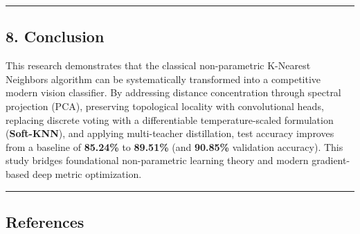 \begin{center}\rule{0.5\linewidth}{0.5pt}\end{center}

\subsection{8. Conclusion}\label{8-conclusion}

This research demonstrates that the classical non-parametric K-Nearest
Neighbors algorithm can be systematically transformed into a competitive
modern vision classifier. By addressing distance concentration through
spectral projection (PCA), preserving topological locality with
convolutional heads, replacing discrete voting with a differentiable
temperature-scaled formulation (\textbf{Soft-KNN}), and applying
multi-teacher distillation, test accuracy improves from a baseline of
\textbf{85.24\%} to \textbf{89.51\%} (and \textbf{90.85\%} validation
accuracy). This study bridges foundational non-parametric learning
theory and modern gradient-based deep metric optimization.

\begin{center}\rule{0.5\linewidth}{0.5pt}\end{center}

\subsection{References}\label{references}

